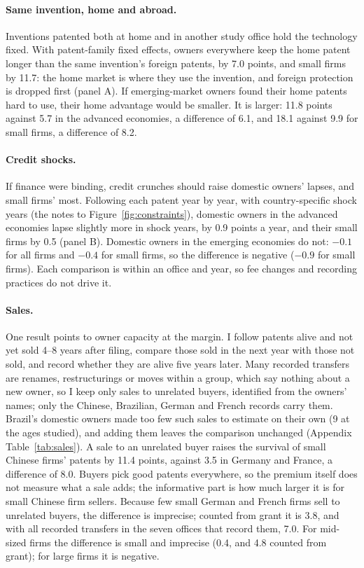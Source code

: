 \paragraph{Same invention, home and abroad.} Inventions patented both at home and in another study office hold the
technology fixed. With patent-family fixed effects, owners everywhere keep the home patent longer than the same
invention's foreign patents, by 7.0 points, and small firms by 11.7: the home market is where they use the invention,
and foreign protection is dropped first (panel A). If emerging-market owners found their home patents hard to use,
their home advantage would be smaller. It is larger: 11.8 points against 5.7 in the advanced economies, a difference
of 6.1, and 18.1 against 9.9 for small firms, a difference of 8.2.

\paragraph{Credit shocks.} If finance were binding, credit crunches should raise domestic owners' lapses, and small
firms' most. Following each patent year by year, with country-specific shock years (the notes to Figure~\ref{fig:constraints}), domestic
owners in the advanced economies lapse slightly more in shock years, by 0.9 points a year, and their small firms by 0.5
(panel B). Domestic owners in the emerging economies do not: $-0.1$ for all firms and $-0.4$ for small firms, so the
difference is negative ($-0.9$ for small firms). Each comparison is within an office and year, so fee changes and
recording practices do not drive it.

\paragraph{Sales.} One result points to owner capacity at the margin. I follow patents alive and not yet sold 4--8
years after filing, compare those sold in the next year with those not sold, and record whether they are alive five
years later. Many recorded transfers are renames, restructurings or moves within a group, which say nothing about a
new owner, so I keep only sales to unrelated buyers, identified from the owners' names; only the Chinese, Brazilian, German and French records carry them. Brazil's
domestic owners made too few such sales to estimate on their own (9 at the ages studied), and adding them leaves the
comparison unchanged (Appendix Table~\ref{tab:sales}). A sale to an unrelated buyer raises the survival of small
Chinese firms' patents by 11.4 points, against 3.5 in Germany and France, a difference of 8.0.
Buyers pick good patents everywhere, so the premium itself does not measure what a sale adds; the informative part is
how much larger it is for small Chinese firm sellers. Because few small German and French firms sell to unrelated
buyers, the difference is imprecise; counted from grant it is 3.8, and with all recorded transfers in the seven
offices that record them, 7.0. For mid-sized firms the difference is small and imprecise (0.4, and 4.8 counted from grant); for large firms it is negative.

